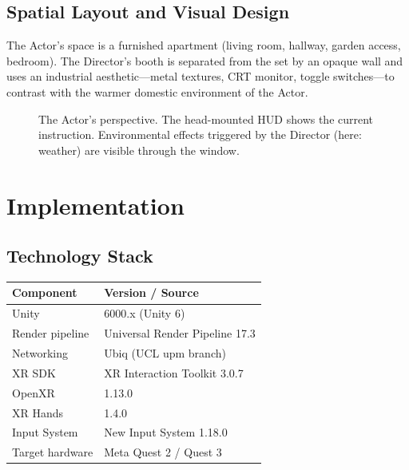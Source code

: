 \documentclass[12pt,a4paper]{article}
\begin{document}
\subsection{Spatial Layout and Visual Design}

The Actor's space is a furnished apartment (living room, hallway, garden access, bedroom). The Director's booth is separated from the set by an opaque wall and uses an industrial aesthetic---metal textures, CRT monitor, toggle switches---to contrast with the warmer domestic environment of the Actor.

\begin{figure}[H]
  \centering
  \caption{The Actor's perspective. The head-mounted HUD shows the current instruction. Environmental effects triggered by the Director (here: weather) are visible through the window.}
  \label{fig:actor}
\end{figure}

\section{Implementation}
\label{sec:impl}

\subsection{Technology Stack}

\begin{center}
\small
\begin{tabular}{@{}ll@{}}
  \toprule
  \textbf{Component} & \textbf{Version / Source} \\
  \midrule
  Unity               & 6000.x (Unity 6) \\
  Render pipeline     & Universal Render Pipeline 17.3 \\
  Networking          & Ubiq (UCL upm branch) \\
  XR SDK              & XR Interaction Toolkit 3.0.7 \\
  OpenXR              & 1.13.0 \\
  XR Hands            & 1.4.0 \\
  Input System        & New Input System 1.18.0 \\
  Target hardware     & Meta Quest 2 / Quest 3 \\
  \bottomrule
\end{tabular}
\end{center}
\end{document}
